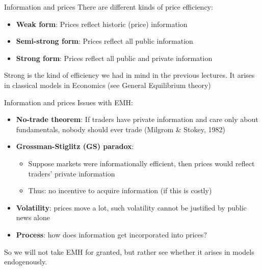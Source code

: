 \documentclass[english,10pt
,aspectratio=169
]{beamer}
\begin{document}
%	


\begin{frame}{Information and prices}
	There are different kinds of price efficiency:
	\begin{itemize}
		\item \textbf{Weak form}: Prices reflect historic (price) information
		\item \textbf{Semi-strong form}: Prices reflect all public information
		\item \textbf{Strong form}: Prices reflect all public and private information
	\end{itemize}
	Strong is the kind of efficiency we had in mind in the previous lectures. It arises in classical models in Economics (see General Equilibrium theory)
\end{frame}


\begin{frame}{Information and prices}
Issues with EMH:
\begin{itemize}
	\item \textbf{No-trade theorem}: If traders have private information and care only about fundamentals, nobody should ever trade (Milgrom \& Stokey, 1982)
	\item \textbf{Grossman-Stiglitz (GS) paradox}: 
	\begin{itemize}
		\item Suppose markets were informationally efficient, then prices would reflect traders' private information
		\item Thus: no incentive to acquire information (if this is costly)
	\end{itemize} 
	\item \textbf{Volatility}: prices move a lot, such volatility cannot be justified by public news alone
	\item \textbf{Process}: \alert{how} does information get incorporated into prices?
\end{itemize}
So we will not take EMH for granted, but rather see whether it arises in models endogenously.
\end{frame}
\end{document}
